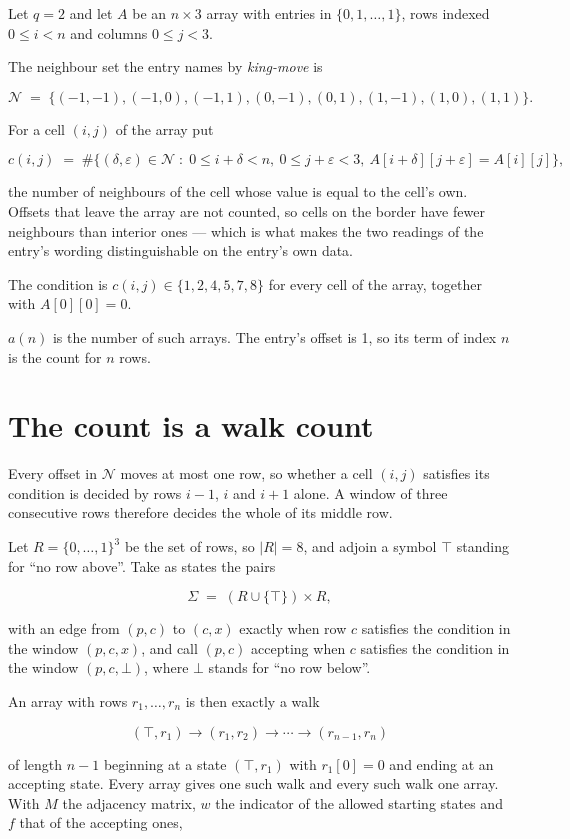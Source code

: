 \documentclass[11pt]{article}
\theoremstyle{definition}
\begin{document}
Let $q = 2$ and let $A$ be an $n \times 3$ array with entries in $\{0,1,\dots,1\}$, rows indexed $0 \le i < n$ and columns $0 \le j < 3$.

The neighbour set the entry names by {\itshape king-move} is

\[\mathcal{N} \;=\; \{(-1,-1), (-1,0), (-1,1), (0,-1), (0,1), (1,-1), (1,0), (1,1)\}.\]

For a cell $(i,j)$ of the array put

\[c(i,j) \;=\; \#\bigl\{(\delta,\varepsilon)\in\mathcal{N} \;:\; 0\le i+\delta<n,\ 0\le j+\varepsilon<3,\ A[i+\delta][j+\varepsilon] = A[i][j]\bigr\},\]

the number of neighbours of the cell whose value is equal to the cell's own. Offsets that leave the array are not counted, so cells on the border have fewer neighbours than interior ones --- which is what makes the two readings of the entry's wording distinguishable on the entry's own data.

The condition is $c(i,j) \in \{1, 2, 4, 5, 7, 8\}$ for every cell of the array, together with $A[0][0]=0$.

$a(n)$ is the number of such arrays. The entry's offset is 1, so its term of index $n$ is the count for $n$ rows.

\section{The count is a walk count}

Every offset in $\mathcal{N}$ moves at most one row, so whether a cell $(i,j)$ satisfies its condition is decided by rows $i-1$, $i$ and $i+1$ alone. A window of three consecutive rows therefore decides the whole of its middle row.

Let $R = \{0,\dots,1\}^{3}$ be the set of rows, so $|R| = 8$, and adjoin a symbol $\top$ standing for ``no row above''. Take as states the pairs

\[\Sigma \;=\; (R \cup \{\top\}) \times R,\]

with an edge from $(p,c)$ to $(c,x)$ exactly when row $c$ satisfies the condition in the window $(p,c,x)$, and call $(p,c)$ accepting when $c$ satisfies the condition in the window $(p,c,\bot)$, where $\bot$ stands for ``no row below''.

An array with rows $r_1,\dots,r_n$ is then exactly a walk

\[(\top,r_1) \to (r_1,r_2) \to \cdots \to (r_{n-1},r_n)\]

of length $n-1$ beginning at a state $(\top,r_1)$ with $r_1[0]=0$ and ending at an accepting state. Every array gives one such walk and every such walk one array. With $M$ the adjacency matrix, $w$ the indicator of the allowed starting states and $f$ that of the accepting ones,
\end{document}
